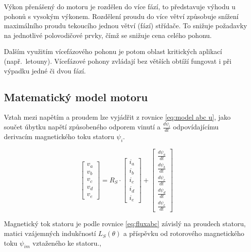 Výkon přenášený do motoru je rozdělen do více fází, to představuje výhodu u pohonů s vysokým výkonem. Rozdělení proudu do více větví způsobuje snížení maximálního proudu tekoucího jednou větví (fází) střídače. To snižuje požadavky na jednotlivé polovodičové prvky, čímž se snižuje cena celého pohonu.

Dalším využitím vícefázového pohonu je potom oblast kritických aplikací (např.~letouny). Vícefázové pohony zvládají bez větších obtíží fungovat i při výpadku jedné či dvou fází. \cite{WileyHigPer}

\subsection{Matematický model motoru}
\label{kap:model abcd}

Vztah mezi napětím a proudem lze vyjádřit  z rovnice \ref{eq:model abc u}, jako součet úbytku napětí způsobeného odporem vinutí a  $\frac{d\psi_i}{dt}$ odpovídajícímu  derivacím magnetického toku statoru $\psi_i$.


\begin{equation}
    \label{eq:model abc u}
    \begin{bmatrix}
        v_a \\ v_b \\ v_c \\ v_d \\ v_e
    \end{bmatrix}
    =
    R_S \cdot
    \begin{bmatrix}
        i_a \\ i_b \\ i_c \\ i_d \\ i_e
    \end{bmatrix}
    +
    \begin{bmatrix}
        \frac{d\psi_a}{dt} \\
    \frac{d\psi_b}{dt} \\
    \frac{d\psi_c}{dt} \\
    \frac{d\psi_d}{dt} \\
    \frac{d\psi_e}{dt}
\end{bmatrix}
\end{equation}

Magnetický tok statoru je podle rovnice \ref{eq:fluxabc} závislý na proudech statoru, matici vzájemných indukčností $L_S(\theta)$ a příspěvku od rotorového magnetického toku $\psi_{im}$ vztaženého ke statoru.\cite{malab_motor},\cite{Model_5phase}

